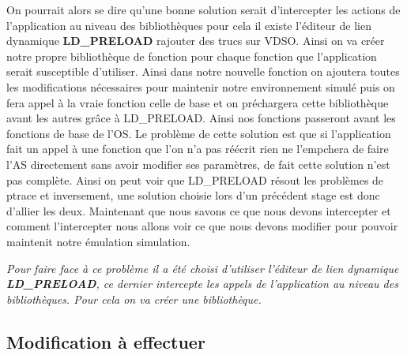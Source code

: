 On pourrait alors se dire qu'une bonne solution serait
d'intercepter les actions de l'application au niveau des bibliothèques pour cela
il existe l'éditeur de lien dynamique \textbf{LD\_PRELOAD} {\color{red} rajouter des trucs sur VDSO}. Ainsi on va créer
notre propre bibliothèque de fonction pour chaque fonction que l'application
serait susceptible d'utiliser. Ainsi dans notre nouvelle fonction on ajoutera
toutes les modifications nécessaires pour maintenir notre environnement simulé
puis on fera appel à la vraie fonction celle de base et on préchargera cette
bibliothèque avant les autres grâce à LD\_PRELOAD. Ainsi nos fonctions passeront
avant les fonctions de base de l'OS. Le problème de cette solution est que si
l'application fait un appel à une fonction que l'on n'a pas réécrit rien ne
l'empchera de faire l'AS directement sans avoir modifier ses paramètres, de fait
cette solution n'est pas complète. Ainsi on peut voir que LD\_PRELOAD résout les
problèmes de ptrace et inversement, une solution choisie lors d'un précédent
stage est donc d'allier les deux. Maintenant que nous savons ce que nous devons
intercepter et comment l'intercepter nous allons voir ce que nous devons
modifier pour pouvoir maintenit notre émulation simulation.

\textit{Pour faire face à ce problème il a été choisi d'utiliser l'éditeur de
  lien dynamique \textbf{LD\_PRELOAD}, ce dernier intercepte les appels de
  l'application au niveau des bibliothèques. Pour cela on va créer une
  bibliothèque.}

\subsection{Modification à effectuer}
